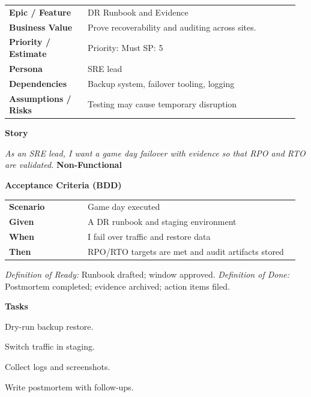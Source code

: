 \documentclass[11pt,letterpaper]{article}
\makeatletter
\newenvironment{kvtable}{%
  \begin{tabular}{@{}>{\bfseries\arraybackslash}p{0.26\linewidth} p{0.70\linewidth}@{}}
}{\end{tabular}}
\newenvironment{bdd}{%
  \begin{tabular}{@{}>{\bfseries\arraybackslash}p{0.26\linewidth} p{0.70\linewidth}@{}}
}{\end{tabular}}
\newcommand{\DoRDoD}[2]{%
  \vspace{0.35em}
  {\footnotesize\color{Muted}%
    \textit{Definition of Ready:} #1 \; \textbullet\;
    \textit{Definition of Done:} #2%
  }%
}
\newenvironment{storycard}[2]{%
  \begin{tcolorbox}[cloudcard, title={#1 --- #2}]%
}{\end{tcolorbox}}
\newcommand{\sectionlabel}[1]{\vspace{0.35em}\textbf{#1}\par}
\makeatother
\begin{document}
\begin{storycard}{CCS-30}{Ch. 30 — Availability, Recovery, \& Auditing}
\begin{kvtable}
Epic / Feature & DR Runbook and Evidence\\
Business Value & Prove recoverability and auditing across sites.\\
Priority / Estimate & Priority: Must \quad SP: 5\\
Persona & SRE lead\\
Dependencies & Backup system, failover tooling, logging\\
Assumptions / Risks & Testing may cause temporary disruption\\
\end{kvtable}
\sectionlabel{Story}
\textit{As an SRE lead, I want a game day failover with evidence so that RPO and RTO are validated.}
\sectionlabel{Non-Functional}\;
\sectionlabel{Acceptance Criteria (BDD)}
\begin{bdd}
Scenario & Game day executed\\
Given & A DR runbook and staging environment\\
When & I fail over traffic and restore data\\
Then & RPO/RTO targets are met and audit artifacts stored\\
\end{bdd}
\DoRDoD{Runbook drafted; window approved.}{Postmortem completed; evidence archived; action items filed.}
\sectionlabel{Tasks}
\begin{checklist}
\item Dry-run backup restore.
\item Switch traffic in staging.
\item Collect logs and screenshots.
\item Write postmortem with follow-ups.
\end{checklist}
\end{storycard}
\end{document}
